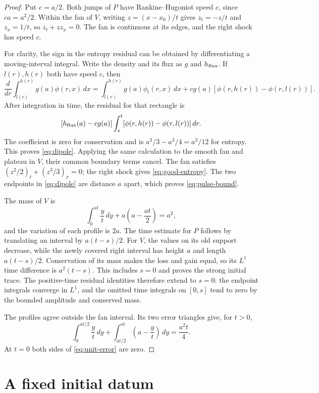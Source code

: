 \documentclass[11pt]{article}
\begin{document}
\begin{proof}
Put $c=a/2$. Both jumps of $P$ have Rankine--Hugoniot speed $c$, since $ca=a^2/2$. Within the fan of $V$, writing $z=(x-x_0)/t$ gives $z_t=-z/t$ and $z_x=1/t$, so $z_t+zz_x=0$. The fan is continuous at its edges, and the right shock has speed $c$.

For clarity, the sign in the entropy residual can be obtained by differentiating a moving-interval integral. Write the density and its flux as $g$ and $h_{\rm flux}$. If $l(r),h(r)$ both have speed $c$, then
\[
 \frac{d}{dr}\int_{l(r)}^{h(r)}g(a)\phi(r,x)\,dx
 =\int_{l(r)}^{h(r)}g(a)\phi_t(r,x)\,dx
 +cg(a)[\phi(r,h(r))-\phi(r,l(r))].
\]
After integration in time, the residual for that rectangle is
\[
 [h_{\rm flux}(a)-cg(a)]\int_s^t
 [\phi(r,h(r))-\phi(r,l(r))]\,dr.
\]
The coefficient is zero for conservation and is $a^3/3-a^3/4=a^3/12$ for entropy. This proves \eqref{eq:dipole}. Applying the same calculation to the smooth fan and plateau in $V$, their common boundary terms cancel. The fan satisfies $(z^2/2)_t+(z^3/3)_x=0$; the right shock gives \eqref{eq:good-entropy}. The two endpoints in \eqref{eq:dipole} are distance $a$ apart, which proves \eqref{eq:pulse-bound}.

The mass of $V$ is
\[
 \int_0^{at}\frac{y}{t}\,dy
 +a\left(a-\frac{at}{2}\right)=a^2,
\]
and the variation of each profile is $2a$. The time estimate for $P$ follows by translating an interval by $a(t-s)/2$. For $V$, the values on its old support decrease, while the newly covered right interval has height $a$ and length $a(t-s)/2$. Conservation of its mass makes the loss and gain equal, so its $L^1$ time difference is $a^2(t-s)$. This includes $s=0$ and proves the strong initial trace. The positive-time residual identities therefore extend to $s=0$: the endpoint integrals converge in $L^1$, and the omitted time integrals on $[0,s]$ tend to zero by the bounded amplitude and conserved mass.

The profiles agree outside the fan interval. Its two error triangles give, for $t>0$,
\[
 \int_0^{at/2}\frac{y}{t}\,dy
 +\int_{at/2}^{at}\left(a-\frac{y}{t}\right)\,dy
 =\frac{a^2t}{4}.
\]
At $t=0$ both sides of \eqref{eq:unit-error} are zero.
\end{proof}

\section{A fixed initial datum}
\end{document}
